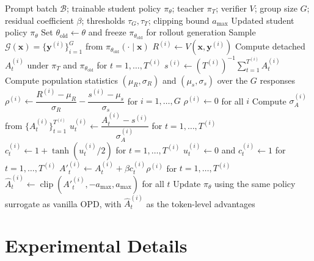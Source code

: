 \begin{algorithm}[H]
\caption{Group-Calibrated On-Policy Distillation}
\label{alg:gcopd}
\begin{algorithmic}[1]
\REQUIRE Prompt batch $\mathcal{B}$; trainable student policy $\pi_\theta$; teacher $\pi_T$;
verifier $V$; group size $G$; residual coefficient $\beta$; thresholds
$\tau_G,\tau_T$; clipping bound $a_{\max}$
\ENSURE Updated student policy $\pi_\theta$
\STATE Set $\theta_{\mathrm{old}}\leftarrow\theta$ and freeze
$\pi_{\theta_{\mathrm{old}}}$ for rollout generation
  \STATE Sample $\mathcal{G}(\mathbf{x})=\{\mathbf{y}^{(i)}\}_{i=1}^{G}$
  from $\pi_{\theta_{\mathrm{old}}}(\cdot\mid\mathbf{x})$
    \STATE $R^{(i)}\leftarrow V(\mathbf{x},\mathbf{y}^{(i)})$
    \STATE Compute detached $A^{(i)}_t$ under $\pi_T$ and
    $\pi_{\theta_{\mathrm{old}}}$ for
    $t=1,\ldots,T^{(i)}$
    \STATE $s^{(i)}\leftarrow (T^{(i)})^{-1}
    \sum_{t=1}^{T^{(i)}} A^{(i)}_t$
  \ENDFOR
  \STATE Compute population statistics $(\mu_R,\sigma_R)$ and
  $(\mu_s,\sigma_s)$ over the $G$ responses
    \STATE $\rho^{(i)}\leftarrow
    \dfrac{R^{(i)}-\mu_R}{\sigma_R}
    -\dfrac{s^{(i)}-\mu_s}{\sigma_s}$ for $i=1,\ldots,G$
  \ELSE
    \STATE $\rho^{(i)}\leftarrow0$ for all $i$
  \ENDIF
    \STATE Compute $\sigma_A^{(i)}$ from
    $\{A^{(i)}_t\}_{t=1}^{T^{(i)}}$
      \STATE $u^{(i)}_t\leftarrow
      \dfrac{A^{(i)}_t-s^{(i)}}{\sigma_A^{(i)}}$
      for $t=1,\ldots,T^{(i)}$
      \STATE $c^{(i)}_t\leftarrow
      1+\tanh\!\left(u^{(i)}_t/2\right)$
      for $t=1,\ldots,T^{(i)}$
    \ELSE
      \STATE $u^{(i)}_t\leftarrow0$ and $c^{(i)}_t\leftarrow1$ for
      $t=1,\ldots,T^{(i)}$
    \ENDIF
    \STATE $A'^{(i)}_t\leftarrow A^{(i)}_t+
    \beta c^{(i)}_t\rho^{(i)}$ for $t=1,\ldots,T^{(i)}$
    \STATE $\widehat A^{(i)}_t\leftarrow
    \operatorname{clip}(A'^{(i)}_t,-a_{\max},a_{\max})$ for all $t$
  \ENDFOR
\ENDFOR
\STATE Update $\pi_\theta$ using the same policy surrogate as vanilla OPD, with
$\widehat A^{(i)}_t$ as the token-level advantages
\end{algorithmic}
\end{algorithm}

\section{Experimental Details}

